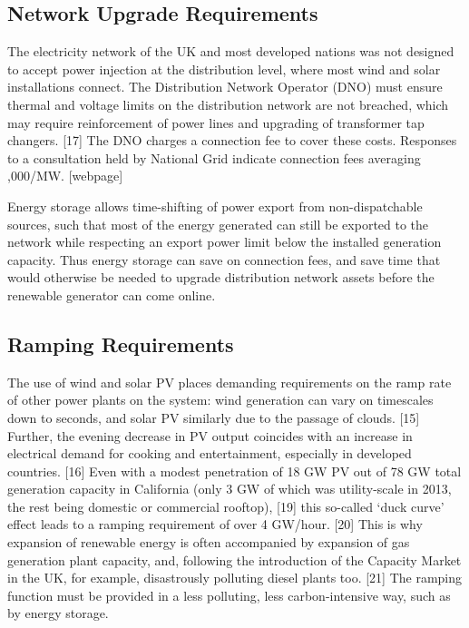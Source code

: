 \documentclass[report_18month.tex]{subfiles}
\begin{document}
\subsection{Network Upgrade Requirements}
\label{sec:Network Upgrade Requirements}
The electricity network of the UK and most developed nations was not designed to accept power injection at the distribution level, where most wind and solar installations connect. The Distribution Network Operator (DNO) must ensure thermal and voltage limits on the distribution network are not breached, which may require reinforcement of power lines and upgrading of transformer tap changers. [17] The DNO charges a connection fee to cover these costs. Responses to a consultation held by National Grid indicate connection fees averaging ,000/MW. [webpage]

Energy storage allows time-shifting of power export from non-dispatchable sources, such that most of the energy generated can still be exported to the network while respecting an export power limit below the installed generation capacity. Thus energy storage can save on connection fees, and save time that would otherwise be needed to upgrade distribution network assets before the renewable generator can come online.

\subsection{Ramping Requirements}
The use of wind and solar PV places demanding requirements on the ramp rate of other power plants on the system: wind generation can vary on timescales down to seconds, and solar PV similarly due to the passage of clouds. [15] Further, the evening decrease in PV output coincides with an increase in electrical demand for cooking and entertainment, especially in developed countries. [16] Even with a modest penetration of 18 GW PV out of 78 GW total generation capacity in California (only 3 GW of which was utility-scale in 2013, the rest being domestic or commercial rooftop), [19] this so-called `duck curve' effect leads to a ramping requirement of over 4 GW/hour. [20] This is why expansion of renewable energy is often accompanied by expansion of gas generation plant capacity, and, following the introduction of the Capacity Market in the UK, for example, disastrously polluting diesel plants too. [21] The ramping function must be provided in a less polluting, less carbon-intensive way, such as by energy storage.
\end{document}
